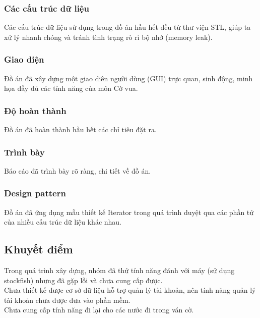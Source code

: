 \subsubsection{Các cấu trúc dữ liệu}
Các cấu trúc dữ liệu sử dụng trong đồ án hầu hết đều từ thư viện STL, giúp ta xử lý nhanh chóng và tránh tình trạng rò rỉ bộ nhớ (memory leak).

\subsubsection{Giao diện}
Đồ án đã xây dựng một giao diên người dùng (GUI) trực quan, sinh động, minh họa đầy đủ các tính năng của môn Cờ vua.

\subsubsection{Độ hoàn thành}
Đồ án đã hoàn thành hầu hết các chỉ tiêu đặt ra.

\subsubsection{Trình bày}
Báo cáo đã trình bày rõ ràng, chi tiết về đồ án.

\subsubsection{Design pattern}
Đồ án đã ứng dụng mẫu thiết kế Iterator trong quá trình duyệt qua các phần tử của nhiều cấu trúc dữ liệu khác nhau.

\subsection{Khuyết điểm}
Trong quá trình xây dựng, nhóm đã thử tính năng đánh với máy (sử dụng stockfish) nhưng đã gặp lỗi và chưa cung cấp được.\\
Chưa thiết kế được cơ sở dữ liệu hỗ trợ quản lý tài khoản, nên tính năng quản lý tài khoản chưa được đưa vào phần mềm.\\
Chưa cung cấp tính năng đi lại cho các nước đi trong ván cờ.